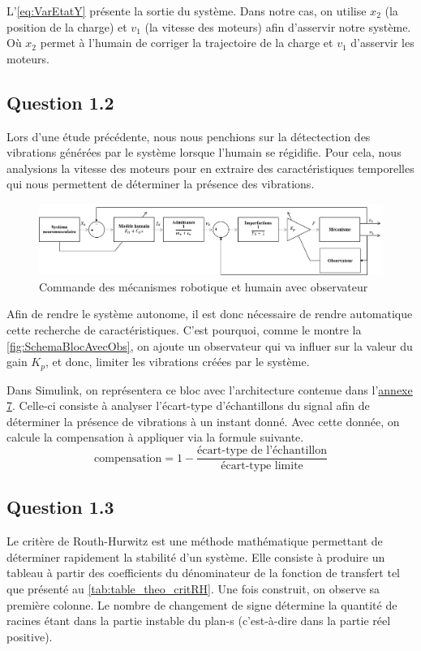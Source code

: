 \documentclass[a4paper,12pt]{article}
\begin{document}
    L'\autoref{eq:VarEtatY} présente la sortie du système. Dans notre cas, on utilise $x_2$ (la position de la charge) et $v_1$ (la vitesse des moteurs) afin d'asservir notre système. Où $x_2$ permet à l'humain de corriger la trajectoire de la charge et $v_1$ d'asservir les moteurs.
    
    
    \subsection{Question 1.2}
    Lors d'une étude précédente, nous nous penchions sur la détectection des vibrations générées par le système lorsque l'humain se régidifie. Pour cela, nous analysions la vitesse des moteurs pour en extraire des caractéristiques temporelles qui nous permettent de déterminer la présence des vibrations.   
    \begin{figure}[H]
        \centering
        \includegraphics[width=16cm]{./img/SchemaBlocAvecObs.png}
        \caption{Commande des mécanismes robotique et humain avec observateur\label{fig:SchemaBlocAvecObs}}
    \end{figure}
    
    Afin de rendre le système autonome, il est donc nécessaire de rendre automatique cette recherche de caractéristiques. C'est pourquoi, comme le montre la \autoref{fig:SchemaBlocAvecObs}, on ajoute un observateur qui va influer sur la valeur du gain $K_p$, et donc, limiter les vibrations créées par le système.
    
    Dans Simulink, on représentera ce bloc avec l’architecture contenue dans l'\hyperref[Annexe:modelObs]{annexe 7}. Celle-ci consiste à analyser l’écart-type d'échantillons du signal afin de déterminer la présence de vibrations à un instant donné. Avec cette donnée, on calcule la compensation à appliquer via la formule suivante.
    \begin{equation}
        \text{compensation} = 1 - \frac{\text{écart-type de l'échantillon}}{\text{écart-type limite}}
    \end{equation}
    
    
    \subsection{Question 1.3}
    Le critère de Routh-Hurwitz est une méthode mathématique permettant de déterminer rapidement la stabilité d'un système. Elle consiste à produire un tableau à partir des coefficients du dénominateur de la fonction de transfert tel que présenté au \autoref{tab:table_theo_critRH}. Une fois construit, on observe sa première colonne. Le nombre de changement de signe détermine la quantité de racines étant dans la partie instable du plan-s (c'est-à-dire dans la partie réel positive).
    
\end{document}

